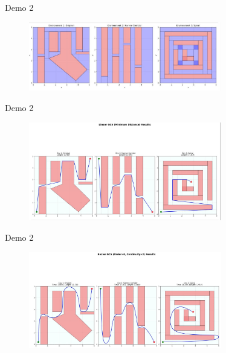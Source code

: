 \documentclass[aspectratio=169]{beamer}
\begin{document}
\begin{frame}{Demo 2}
    \begin{figure}
        \centering
        \includegraphics[width=0.75\textwidth]{../imgs/3env-2d.png}
        \caption{}
    \end{figure}
\end{frame}

\begin{frame}{Demo 2}
    \begin{figure}
        \centering
        \includegraphics[width=0.75\textwidth]{../imgs/3env-2d-min-dis.png}
        \caption{}
    \end{figure}
\end{frame}

\begin{frame}{Demo 2}
    \begin{figure}
        \centering
        \includegraphics[width=0.75\textwidth]{../imgs/3env-2d-min-time.png}
        \caption{}
    \end{figure}
\end{frame}
\end{document}
